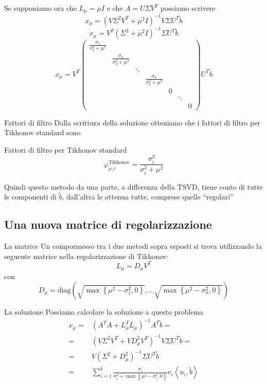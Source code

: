 \documentclass{beamer}
\theoremstyle{plain}
\theoremstyle{definition}
\theoremstyle{remark}
\newcommand{\set}[1]{\left\{#1\right\}}
\newcommand{\pa}[1]{\left(#1\right)}
\newcommand{\ang}[1]{\left<#1\right>}
\begin{document}
\begin{frame}
  Se supponiamo ora che $L_\mu = \mu I$ e che $A = U\Sigma V^T$
  possiamo scrivere
  \[  x_\mu = \pa{ V \Sigma ^2 V^T + \mu ^2 I }^{-1} V \Sigma U^T \tilde b  \]
  \[  x_\mu = V^T \pa{\Sigma ^2 + \mu ^2 I }^{-1} \Sigma U^T \tilde b \]
  \[  x_\mu = V^T
  \begin{pmatrix}
    \frac{\sigma _1 }{\sigma _1 ^2 + \mu ^2} \\
    & \frac{\sigma _2 }{\sigma _2 ^2 + \mu ^2} \\
    & & \ddots \\
    & & & \frac{\sigma _k }{\sigma _k ^2 + \mu ^2}\\
    & & & & 0\\
    & & & & & \ddots \\
    & & & & & & 0
  \end{pmatrix}
  U^T \tilde  b \]
\end{frame}

\begin{frame}{Fattori di filtro}
  Dalla scrittura della soluzione otteniamo che i fattori di filtro
  per Tikhonov standard sono
  \begin{block}{Fattori di filtro per Tikhonov standard}
  \[ \varphi ^{\text{Tikhonov}} _{\mu,i} = \frac{\sigma _i ^2}{\sigma _i
    ^2 + \mu ^2} \]
  \end{block}
  \vfill
  
  Quindi questo metodo da una parte, a differenza della TSVD, tiene
  conto di tutte le componenti di $\tilde b$, dall'altra le attenua
  tutte, comprese quelle ``regolari''
\end{frame}


\subsection{Una nuova matrice di regolarizzazione}

\begin{frame}{La matrice}
  Un compormesso tra i due metodi sopra esposti si trova utilizzando
  la seguente matrice nella regolarizzazione di Tikhonov:
  \[ L_\mu = D _\mu V^T \]
  con
  \[ D_\mu = \mathrm{diag}\pa{ \sqrt{\max\set{\mu ^2 - \sigma _1
        ^2,0}} , ... \sqrt{\max\set{\mu ^2 - \sigma _n ^2,0}} } \]
\end{frame}

\begin{frame}{La soluzione}
  Possiamo calcolare la soluzione a questo problema
  \begin{align*}
    x_\mu =& \pa{ A^T A + L_\mu^T L_\mu }^{-1} A^T \tilde b = \\
    = & \pa{ V \Sigma ^2 V^T + V D_\mu ^2 V^T} ^{-1} V\Sigma U^T \tilde
    b = \\
    = & V \pa{ \Sigma ^2 + D_\mu ^2 } ^{-1} \Sigma U^T \tilde b \\
    = & \sum _{i=1} ^k \frac{\sigma _i}{\sigma _i ^2 + \max\set{
      \mu ^2 - \sigma _i ^2 ,0}  }  v_i \ang{u_i,\tilde b}
  \end{align*}
\end{frame}
\end{document}
